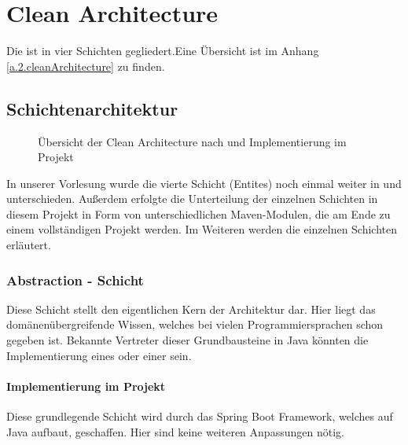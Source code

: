 
\chapter{Clean Architecture} \label{2.cleanArchitecture}
Die  ist in vier Schichten gegliedert.Eine Übersicht ist im Anhang \cref{a.2.cleanArchitecture} zu finden.

	\section{Schichtenarchitektur}
	\begin{figure}[h]
		\centering
		\caption{Übersicht der Clean Architecture nach \cite{cleanArchitecture.dostmann} und Implementierung im Projekt}
		\label{2.cleanArchitecture}
	\end{figure}
	In unserer Vorlesung wurde die vierte Schicht (Entites) noch einmal weiter in  und  unterschieden. Außerdem erfolgte die Unterteilung der einzelnen Schichten in diesem Projekt in Form von unterschiedlichen Maven-Modulen, die am Ende zu einem vollständigen Projekt  werden. Im Weiteren werden die einzelnen Schichten erläutert.

	\newpage

		\subsection{Abstraction - Schicht}
		Diese Schicht stellt den eigentlichen Kern der Architektur dar. Hier liegt das domänenübergreifende Wissen, welches bei vielen Programmiersprachen schon gegeben ist. Bekannte Vertreter dieser Grundbausteine in Java könnten die Implementierung eines  oder einer  sein.
			\subsubsection{Implementierung im Projekt}
			Diese grundlegende Schicht wird durch das Spring Boot Framework, welches auf Java aufbaut, geschaffen. Hier sind keine weiteren Anpassungen nötig.
		
